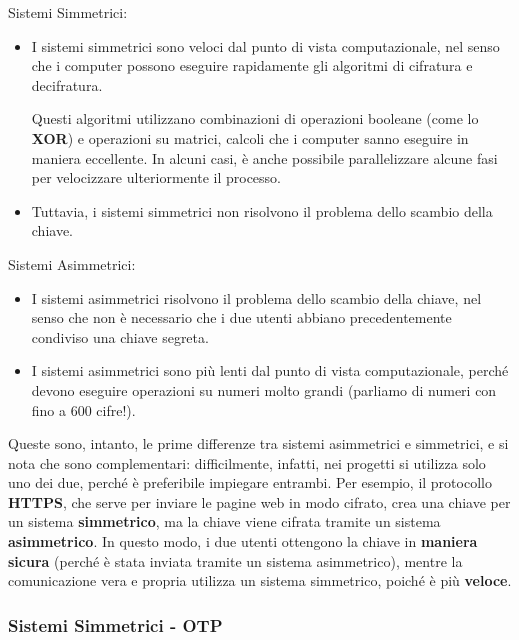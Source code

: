 \documentclass{report}
\begin{document}
Sistemi Simmetrici:

\begin{itemize}
    \item I sistemi simmetrici sono veloci dal punto di vista computazionale, nel senso che i computer possono eseguire rapidamente gli algoritmi di cifratura e decifratura. 
    
    Questi algoritmi utilizzano combinazioni di operazioni booleane (come lo \textbf{XOR}) e operazioni su matrici, calcoli che i computer sanno eseguire in maniera eccellente. In alcuni casi, è anche possibile parallelizzare alcune fasi per velocizzare ulteriormente il processo.
     
    \item Tuttavia, i sistemi simmetrici non risolvono il problema dello scambio della chiave.
\end{itemize}

Sistemi Asimmetrici:

\begin{itemize}
    \item I sistemi asimmetrici risolvono il problema dello scambio della chiave, nel senso che non è necessario che i due utenti abbiano precedentemente condiviso una chiave segreta.
    \item I sistemi asimmetrici sono più lenti dal punto di vista computazionale, perché devono eseguire operazioni su numeri molto grandi (parliamo di numeri con fino a 600 cifre!).
\end{itemize}


Queste sono, intanto, le prime differenze tra sistemi asimmetrici e simmetrici, e si nota che sono complementari: difficilmente, infatti, nei progetti si utilizza solo uno dei due, perché è preferibile impiegare entrambi. Per esempio, il protocollo \textbf{HTTPS}, che serve per inviare le pagine web in modo cifrato, crea una chiave per un sistema \textbf{simmetrico}, ma la chiave viene cifrata tramite un sistema \textbf{asimmetrico}. In questo modo, i due utenti ottengono la chiave in \textbf{maniera sicura} (perché è stata inviata tramite un sistema asimmetrico), mentre la comunicazione vera e propria utilizza un sistema simmetrico, poiché è più \textbf{veloce}.

\newpage

\subsubsection{Sistemi Simmetrici - OTP}
\end{document}
